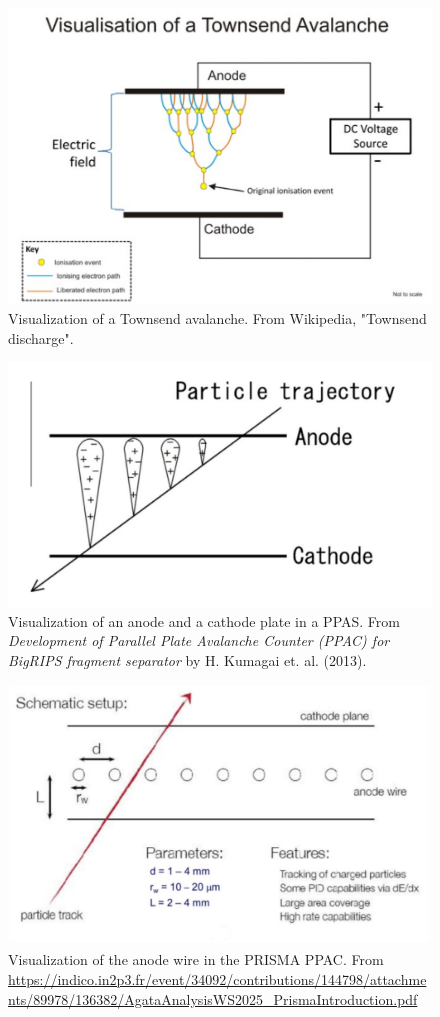 \documentclass{article}
\begin{document}
\begin{figure}[htbp!]
    \centering
    \includegraphics[width=0.5\linewidth]{Figures/PRISMA/PPAC/TownsendAvalanche.pdf}
    \caption{Visualization of a Townsend avalanche. From Wikipedia, "Townsend discharge".}
    \label{fig:Townsend}
\end{figure}
\begin{figure}[htbp!]
    \centering
    \includegraphics[width=0.5\linewidth]{Figures/PRISMA/PPAC/PPACAnodeCathode.pdf}
    \caption{Visualization of an anode and a cathode plate in a PPAS. From \emph{Development of Parallel Plate Avalanche Counter (PPAC)
for BigRIPS fragment separator} by H. Kumagai et. al. (2013).}
    \label{fig:PPACAnodeCathode}
\end{figure}
\begin{figure}[htbp!]
    \centering
    \includegraphics[width=0.5\linewidth]{Figures/PRISMA/PPAC/AnodeWireScem.pdf}
    \caption{Visualization of the anode wire in the PRISMA PPAC. From \url{https://indico.in2p3.fr/event/34092/contributions/144798/attachments/89978/136382/AgataAnalysisWS2025_PrismaIntroduction.pdf}}
    \label{fig:PrismaAnodeWireSchem}
\end{figure}
\end{document}
